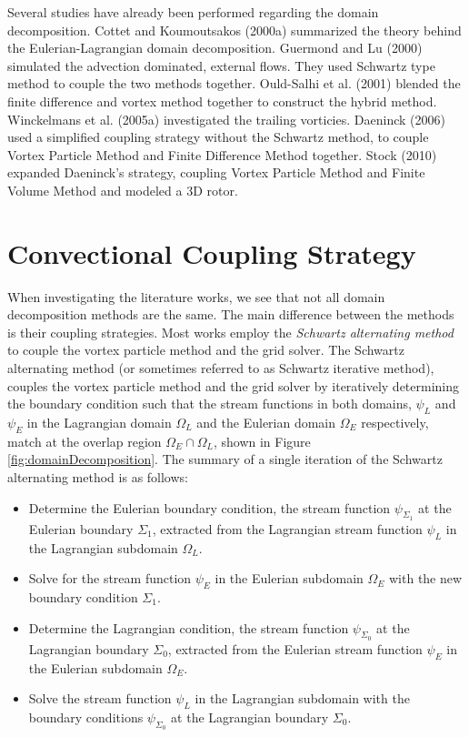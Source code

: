 	Several studies have already been performed regarding the domain decomposition. Cottet and Koumoutsakos (2000a)\cite{Cottet2000a} summarized the theory behind the Eulerian-Lagrangian domain decomposition. Guermond and Lu (2000) \cite{Guermond2000a} simulated the advection dominated, external flows. They used Schwartz type method to couple the two methods together. Ould-Salhi et al. (2001) \cite{Ould-Salihi2001a} blended the finite difference and vortex method together to construct the hybrid method. Winckelmans et al. (2005a) \cite{Winckelmans2005} investigated the trailing vorticies. Daeninck (2006) \cite{Daeninck2006} used a simplified coupling strategy without the Schwartz method, to couple Vortex Particle Method and Finite Difference Method together. Stock (2010) \cite{Stock2010a} expanded Daeninck's strategy, coupling Vortex Particle Method and Finite Volume Method and modeled a 3D rotor.

	\section{Convectional Coupling Strategy}
	\label{sec:helvpm-ccs}
	
	When investigating the literature works, we see that not all domain decomposition methods are the same. The main difference between the methods is their coupling strategies. Most works employ the\textit{ Schwartz alternating method} to couple the vortex particle method and the grid solver. The Schwartz alternating method (or sometimes referred to as Schwartz iterative method), couples the vortex particle method and the grid solver by iteratively determining the boundary condition such that the stream functions in both domains, $\psi_L$ and $\psi_E$ in the Lagrangian domain $\Omega_L$ and the Eulerian domain $\Omega_E$ respectively, match at the overlap region $\Omega_E\cap\Omega_L$, shown in Figure \ref{fig:domainDecomposition}. The summary of a single iteration of the Schwartz alternating method is as follows:
	
		\begin{itemize}
		\item Determine the Eulerian boundary condition, the stream function $\psi_{\Sigma_1}$ at the Eulerian boundary $\Sigma_1$, extracted from the Lagrangian stream function $\psi_L$ in the Lagrangian subdomain $\Omega_L$.
		\item Solve for the stream function $\psi_E$ in the Eulerian subdomain $\Omega_E$ with the new boundary condition $\Sigma_1$.
		\item Determine the Lagrangian condition, the stream function $\psi_{\Sigma_0}$ at the Lagrangian boundary $\Sigma_0$, extracted from the Eulerian stream function $\psi_E$ in the Eulerian subdomain $\Omega_E$.
		\item Solve the stream function $\psi_L$ in the Lagrangian subdomain with the boundary conditions $\psi_{\Sigma_0}$ at the Lagrangian boundary $\Sigma_0$.
		\end{itemize}
	
